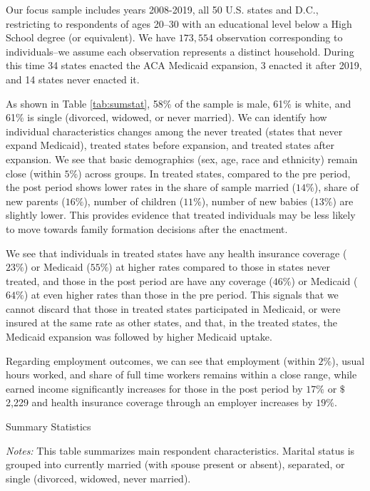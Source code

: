 \documentclass{article}
\begin{document}
Our focus sample includes years 2008-2019, all 50 U.S. states and D.C., restricting to respondents of ages 20--30 with an educational level below a High School degree (or equivalent). We have $173,554$ observation corresponding to individuals--we assume each observation represents a distinct household. During this time 34 states enacted the ACA Medicaid expansion, 3 enacted it after 2019, and 14 states never enacted it.

As shown in Table \ref{tab:sumstat}, 58\% of the sample is male, 61\% is white, and 61\% is single (divorced, widowed, or never married). We can identify how individual characteristics changes among the never treated (states that never expand Medicaid), treated states before expansion, and treated states after expansion. We see that basic demographics (sex, age, race and ethnicity) remain close (within $5\%$) across groups. In treated states, compared to the pre period, the post period shows lower rates in the share of sample married ($14\%$), share of new parents ($16\%$), number of children ($11\%$), number of new babies ($13\%$) are slightly lower. This provides evidence that treated individuals may be less likely to move towards family formation decisions after the enactment.

We see that individuals in treated states have any health insurance coverage ($23\%$) or Medicaid ($55\%$) at higher rates compared to those in states never treated, and those in the post period are have any coverage ($46\%$) or Medicaid ($64\%$) at even higher rates than those in the pre period. This signals that we cannot discard that those in treated states participated in Medicaid, or were insured at the same rate as other states, and that, in the treated states, the Medicaid expansion was followed by higher Medicaid uptake.

Regarding employment outcomes, we can see that employment (within $2\%$), usual hours worked, and share of full time workers remains within a close range, while earned income significantly increases for those in the post period by $17\%$ or $\$$2,229 and health insurance coverage through an employer increases by $19\%$.

\begin{table}[h!]
\begin{centering}
\singlespacing
\caption{Summary Statistics}
\label{tab:sumstat}
\end{centering}
\begin{spacing}{1}
\begin{footnotesize}

\textit{Notes:} This table summarizes main respondent characteristics. Marital status is grouped into currently married (with spouse present or absent), separated, or single (divorced, widowed, never married). 
\end{footnotesize}
\end{spacing}
\end{table}
\end{document}
